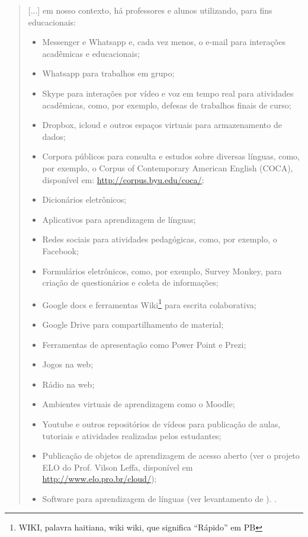 \documentclass{textolivre}
\begin{document}
\begin{quote}
    [...] em nosso contexto, há professores e alunos utilizando, para fins educacionais:
    \begin{itemize}
\item Messenger e Whatsapp e, cada vez menos, o e-mail para interações acadêmicas e educacionais;
\item Whatsapp para trabalhos em grupo;
\item Skype para interações por vídeo e voz em tempo real para atividades acadêmicas, como, por exemplo, defesas de trabalhos finais de curso;
\item Dropbox, icloud e outros espaços virtuais para armazenamento de dados;
\item Corpora públicos para consulta e estudos sobre diversas línguas, como, por exemplo, o Corpus of Contemporary American English (COCA), disponível em: \url{http://corpus.byu.edu/coca/};
\item Dicionários eletrônicos;
\item Aplicativos para aprendizagem de línguas;
\item Redes sociais para atividades pedagógicas, como, por exemplo, o Facebook;
\item Formulários eletrônicos, como, por exemplo, Survey Monkey, para criação de questionários e coleta de informações;
\item Google docs e ferramentas Wiki\footnote{WIKI, palavra haitiana, wiki wiki, que significa “Rápido” em PB} para escrita colaborativa;
\item Google Drive para compartilhamento de material;
\item Ferramentas de apresentação como Power Point e Prezi;
\item Jogos na web;
\item Rádio na web;
\item Ambientes virtuais de aprendizagem como o Moodle;
\item Youtube e outros repositórios de vídeos para publicação de aulas, tutoriais e atividades realizadas pelos estudantes;
\item Publicação de objetos de aprendizagem de acesso aberto (ver o projeto ELO do Prof. Vilson Leffa, disponível em \url{http://www.elo.pro.br/cloud/});
\item Software para aprendizagem de línguas (ver levantamento de \textcite{borges_are_2014}). \cite[p. 18]{menezes_tecnologias_2019}.
    \end{itemize}
\end{quote}
\end{document}
